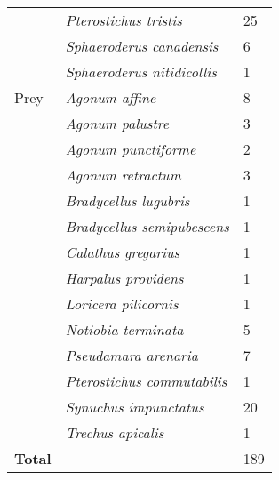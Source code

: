 \begin{table}[ht]
\begin{tabular}{lll}
                            & \textit{Pterostichus tristis}             & 25 \\
                            & \textit{Sphaeroderus canadensis}          & 6 \\
                            & \textit{Sphaeroderus nitidicollis}        & 1 \\
                            \hline 
        Prey                & \textit{Agonum affine}                    & 8 \\ 
                            & \textit{Agonum palustre}                  & 3 \\
                            & \textit{Agonum punctiforme}               & 2 \\ 
                            & \textit{Agonum retractum}                 & 3 \\ 
                            & \textit{Bradycellus lugubris}             & 1 \\
                            & \textit{Bradycellus semipubescens}        & 1 \\
                            & \textit{Calathus gregarius}               & 1 \\
                            & \textit{Harpalus providens}               & 1 \\
                            & \textit{Loricera pilicornis}              & 1 \\
                            & \textit{Notiobia terminata}               & 5 \\
                            & \textit{Pseudamara arenaria}              & 7 \\
                            & \textit{Pterostichus commutabilis}        & 1 \\
                            & \textit{Synuchus impunctatus}             & 20 \\
                            & \textit{Trechus apicalis}                 & 1 \\
                            \hline 
        \textbf{Total}      &                                           & 189 \\
        \hline
    \end{tabular}
  \end{table}

